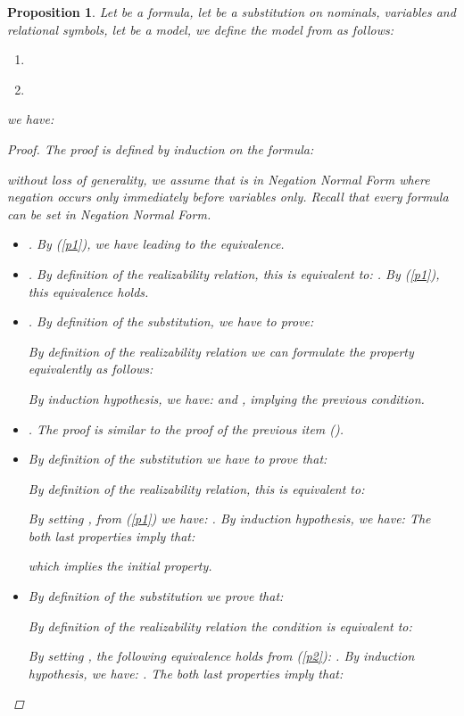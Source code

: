 \documentclass{eptcs}
\newtheorem{proposition}{Proposition}
\newcounter{ti}
\begin{document}
\begin{proposition}
\label{prop:correct1}
Let  be a formula, let  be a substitution on nominals, variables and relational symbols, let  be a model, we define the model  from  as follows:

\begin{enumerate}
\item  \label{p1}
\item  \label{p2}
\end{enumerate}
 we have: 

\begin{proof}
The proof is defined by induction on the formula:

without loss of generality, we assume that  is in Negation Normal Form where negation occurs only immediately before variables only. Recall that every formula can be set in Negation Normal Form. 
\begin{itemize}
\item . By (\ref{p1}), we have  leading to the equivalence.

\item . By definition of the realizability relation, this is equivalent to: . By (\ref{p1}), this equivalence holds.

\item . 
 By definition of the substitution, we have to prove:
 
By definition of the realizability relation we can formulate the property equivalently as follows: 
 
By induction hypothesis, we have:  and , implying the previous condition.

\item . The proof is similar to the proof of the previous item ().

\item 
By definition of the substitution we have to prove that: 

By definition of the realizability relation, this is equivalent to:

By setting , from (\ref{p1}) we have: .
By induction hypothesis, we have: 
The both last properties imply that:

which implies the initial property.

\item 
By definition of the substitution we prove that:


By definition of the realizability relation the condition is equivalent to:

 By setting , the following equivalence holds from (\ref{p2}): . By induction hypothesis, we have: .
The both last properties imply that:
 

\end{itemize}
\end{proof}
\end{proposition}
\end{document}
